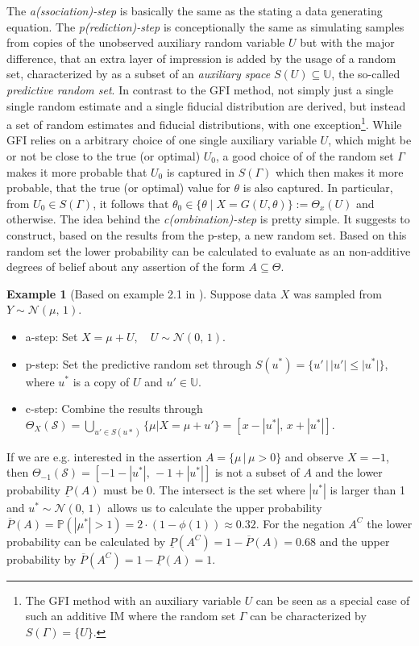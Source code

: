 \documentclass[
]{report}
\theoremstyle{definition}
\theoremstyle{definition}
\newtheorem{example}{Example}[section]
\begin{document}
The \textit{a(ssociation)-step} is basically the same as the stating a
data generating equation. The \textit{p(rediction)-step} is
conceptionally the same as simulating samples from copies of the
unobserved auxiliary random variable \(U\) but with the major
difference, that an extra layer of impression is added by the usage of a
random set, characterized by as a subset of an \textit{auxiliary space}
\(S(U) \subseteq \mathbb{U}\), the so-called
\textit{predictive random set}. In contrast to the GFI method, not
simply just a single single random estimate and a single fiducial
distribution are derived, but instead a set of random estimates and
fiducial distributions, with one
exception\footnote{The GFI method with an auxiliary variable $U$ can be seen as a special case of such an additive IM where the random set $\Gamma$ can be characterized by $S( \Gamma) = \{U \}$.}.
While GFI relies on a arbitrary choice of one single auxiliary variable
\(U\), which might be or not be close to the true (or optimal) \(U_0\),
a good choice of of the random set \(\Gamma\) makes it more probable
that \(U_0\) is captured in \(S(\Gamma)\) which then makes it more
probable, that the true (or optimal) value for \(\theta\) is also
captured. In particular, from \(U_0 \in S(\Gamma)\), it follows that
\(\theta_0 \in \{ \theta \mid X = G(U, \theta) \} := \Theta_x(U)\) and
otherwise. The idea behind the \textit{c(ombination)-step} is pretty
simple. It suggests to construct, based on the results from the p-step,
a new random set. Based on this random set the lower probability can be
calculated to evaluate as an non-additive degrees of belief about any
assertion of the form \(A \subseteq \Theta\).

\begin{example}[Based on example 2.1 in \cite{ermini_leaf_inference_2012}]
Suppose data $X$ was sampled from $Y \sim \mathcal{N}(\mu, \, 1)$.
\begin{itemize}
  \item a-step: Set $X = \mu + U, \quad U \sim \mathcal{N}(0, \, 1)$.
  \item p-step: Set the predictive random set through $S(u^*) = \{u' \, | \, |u'| \leq |u^*| \}$, where $u^*$ is a copy of $U$ and $u' \in \mathbb{U}$.
  \item c-step: Combine the results through $\Theta_X (\mathcal{S}) = \bigcup_{u' \in S(u*)} \{ \mu | X = \mu + u' \} = [x - |u^*|, \, x + |u^*|]$. 
\end{itemize}

If we are e.g. interested in the assertion $A = \{\mu \, | \, \mu > 0\}$ and observe $X = -1$, then $\Theta_{-1} (\mathcal{S}) = [-1 - |u^* |, \, -1 + |u^*|]$ is not a subset of $A$ and the lower probability $\underline{P}(A)$ must be 0. The intersect is the set where $|u^*|$ is larger than 1 and $u^* \sim \mathcal{N}(0, \, 1)$ allows us to calculate the upper probability  $\overline{P}(A) = \mathbb{P}(|\mu^*| > 1) = 2 \cdot (1 - \phi(1)) \approx 0.32$. For the negation $A^C$ the lower probability can be calculated by $\underline{P} (A^C) = 1 - \overline{P}(A) = 0.68$ and the upper probability by $\overline{P} (A^C) = 1 - \underline{P}(A) = 1$.
\end{example}
\end{document}
